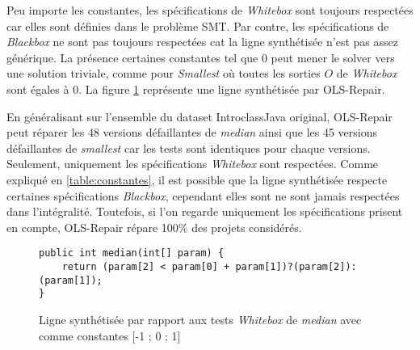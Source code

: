\par Peu importe les constantes, les spécifications de \textit{Whitebox} sont toujours respectées car elles sont définies dans le problème SMT. Par contre, les spécifications de  \textit{Blackbox} ne sont pas toujours respectées cat la ligne synthétisée n'est pas assez générique. La présence certaines constantes tel que 0 peut mener le solver vers une solution triviale, comme pour \textit{Smallest} où toutes les sorties $O$ de \textit{Whitebox} sont égales à 0. La figure \ref{fig:exemple_synth} représente une ligne synthétisée par OLS-Repair.

\newpage
En généralisant sur l'ensemble du dataset IntroclassJava original, OLS-Repair peut réparer les 48 versions défaillantes de \textit{median} ainsi que les 45 versions défaillantes de \textit{smallest} car les tests sont identiques pour chaque versions. Seulement, uniquement les spécifications \textit{Whitebox} sont respectées. Comme expliqué en \ref{table:constantes}, il est possible que la ligne synthétisée respecte certaines spécifications \textit{Blackbox}, cependant elles sont ne sont jamais respectées dans l'intégralité. Toutefois, si l'on regarde uniquement les spécifications prisent en compte, OLS-Repair répare 100\% des projets considérés.

\begin{figure}
\begin{lstlisting}
public int median(int[] param) {
    return (param[2] < param[0] + param[1])?(param[2]):(param[1]);
}
\end{lstlisting}
\caption{Ligne synthétisée par rapport aux tests \textit{Whitebox} de \textit{median} avec comme constantes [-1 ; 0 ; 1]}
\label{fig:exemple_synth}
\end{figure}




